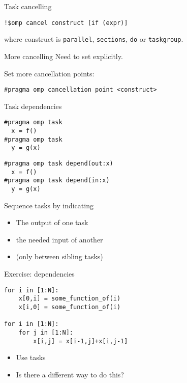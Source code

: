 \begin{numberedframe}{Task cancelling}
\begin{lstlisting}[language=omp]
!$omp cancel construct [if (expr)]
\end{lstlisting}
where construct is
\lstinline[language=omp]{parallel},
\lstinline[language=omp]{sections},
\lstinline[language=omp]{do}
or
\lstinline[language=omp]{taskgroup}.
\end{numberedframe}

\begin{numberedframe}{More cancelling}
  Need to set   explicitly.

  Set more cancellation points:
\begin{lstlisting}[language=omp]
#pragma omp cancellation point <construct>
\end{lstlisting}
\end{numberedframe}

\begin{numberedframe}{Task dependencies}
\begin{multicols}{2}
\begin{lstlisting}
#pragma omp task
  x = f()
#pragma omp task
  y = g(x)
\end{lstlisting}
\columnbreak
\footnotesize
\begin{lstlisting}
#pragma omp task depend(out:x)
  x = f()
#pragma omp task depend(in:x)
  y = g(x)
\end{lstlisting}
\end{multicols}

 Sequence tasks by indicating
  \begin{itemize}
  \item The output of one task
  \item the needed input of another
  \item (only between sibling tasks)
  \end{itemize}
\end{numberedframe}

\begin{numberedframe}{Exercise: dependencies}
\begin{lstlisting}
for i in [1:N]:
    x[0,i] = some_function_of(i)
    x[i,0] = some_function_of(i)

for i in [1:N]:
    for j in [1:N]:
        x[i,j] = x[i-1,j]+x[i,j-1]
\end{lstlisting}
  \begin{itemize}
  \item Use tasks
  \item Is there a different way to do this?
  \end{itemize}
\end{numberedframe}

